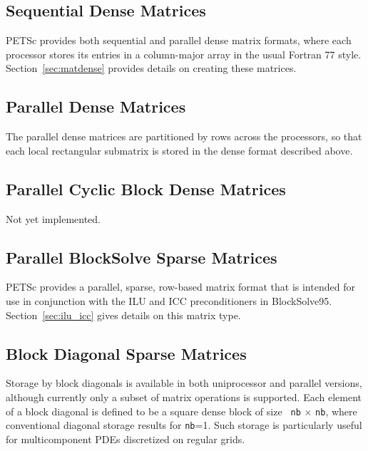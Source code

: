 \subsection{Sequential Dense Matrices}

PETSc provides both sequential and parallel dense matrix formats,
where each processor stores its entries in a column-major array in the
usual Fortran 77 style.  Section~\ref{sec:matdense} provides details
on creating these matrices.

\subsection{Parallel Dense Matrices}

The parallel dense matrices are partitioned by rows across the
processors, so that each local rectangular submatrix is stored in the
dense format described above.

\subsection{Parallel Cyclic Block Dense Matrices}
Not yet implemented.

\subsection{Parallel BlockSolve Sparse Matrices}

PETSc provides a parallel, sparse, row-based matrix format that is
intended for use in conjunction with the ILU and ICC preconditioners
in BlockSolve95.  Section~\ref{sec:ilu_icc} gives details on this
matrix type.

\subsection{Block Diagonal Sparse Matrices}
\label{sec:bdiag}

Storage  by block diagonals is
available in both uniprocessor and parallel versions, although currently
only a subset of matrix operations is supported.  Each element of
a block diagonal is defined to be a square dense block of size {\tt
nb} $\times$ {\tt nb}, where conventional diagonal storage results for
{\tt nb}=1.  Such storage is particularly useful for multicomponent PDEs
discretized on regular grids.

